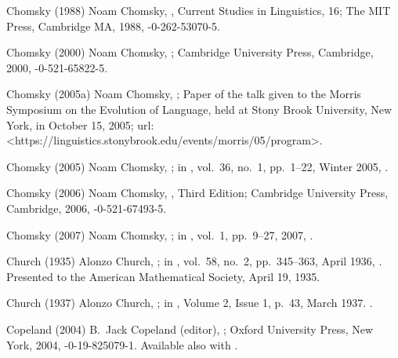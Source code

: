 \biblabel Chomsky (1988)
Noam Chomsky,
,
Current Studies in Linguistics, 16;
The MIT Press, Cambridge MA, 1988,
-0-262-53070-5.

\biblabel Chomsky (2000)
Noam Chomsky,
;
Cambridge University Press, Cambridge, 2000,
-0-521-65822-5.

\biblabel Chomsky (2005a)
Noam Chomsky,
;
Paper of the talk given to the
Morris Symposium on the Evolution of Language,
held at Stony Brook University, New York,
in October 15, 2005;
{\sc url:}
\URL<https://linguistics.stonybrook.edu/events/morris/05/program>.

\biblabel Chomsky (2005)
Noam Chomsky,
;
in ,
vol.\ 36, no.\ 1, pp.\ 1--22, Winter 2005,
.

\biblabel Chomsky (2006)
Noam Chomsky,
, Third Edition;
Cambridge University Press, Cambridge, 2006,
-0-521-67493-5.

\biblabel Chomsky (2007)
Noam Chomsky,
;
in ,
vol.\ 1, pp.\ 9--27, 2007,
.


\biblabel Church (1935)
Alonzo Church,
;
in ,
vol.\ 58, no.\ 2, pp.\ 345--363, April 1936,
.
Presented to the American Mathematical Society,
April 19, 1935.

\biblabel Church (1937)
Alonzo Church,
;
in ,
Volume 2, Issue 1, p.~43, March 1937.
.

\biblabel Copeland (2004)
B.\ Jack Copeland (editor),
;
Oxford University Press, New York, 2004,
-0-19-825079-1.
Available also with .

